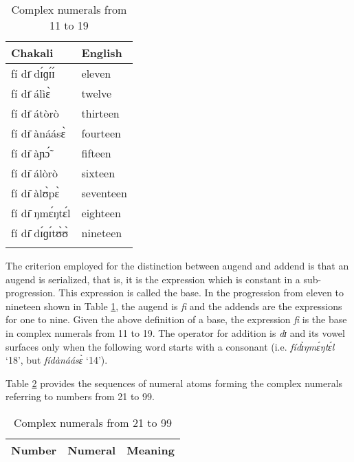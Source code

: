 \begin{exe}
\begin{exe}
\begin{exe}
{\begin{exe}
\begin{exe}
\begin{exe}
\begin{exe}
\begin{exe}
\begin{exe}
\begin{exe}
\begin{xlist}
\begin{exe}
\begin{exe}
\begin{exe}
  \begin{table}[!h]
  \caption{Complex numerals from 11 to 19  \label{tab:numral11-19}}
   \centering

  \begin{tabular}{ll}
\lsptoprule
 Chakali & English   \\ \midrule
 fí dɪ̄ dɪ́ɡɪ́ɪ́ & eleven  \\
 fí dɪ̄ álìɛ̀ & twelve  \\
  fí dɪ̄ átòrò &  thirteen \\
fí dɪ̄ ànáásɛ̀ &  fourteen \\
 fí dɪ̄ àɲɔ̃́ &  fifteen \\
 fí dɪ̄ álòrò  & sixteen  \\
fí dɪ̄ àlʊ̀pɛ̀ &  seventeen \\
  fí dɪ̄ ŋmɛ́ŋtɛ́l  &  eighteen \\
  fí dɪ̄ dɪ́ɡɪ́tʊ̀ʊ̀ &  nineteen \\

\lspbottomrule
\end{tabular}
\end{table}

The criterion employed for  the distinction between augend and addend is that an
augend is serialized, that is, it is the expression which is constant in a
sub-progression. This expression is called the base. In the progression from 
eleven to nineteen shown  in  Table  \ref{tab:numral11-19},  the augend is {\it 
fi} and the addends are the expressions for one to nine. Given the
above definition of a base,  the expression 
{\it fi} is  the base in complex
numerals  from 11 to 19. The operator for
addition is {\it dɪ} and its vowel surfaces only when the
 following word starts with a consonant (i.e. {\it fídɪ̀ŋmɛ́ŋtɛ́l} `18', but
{\it 
fídànáásɛ̀} `14').




Table \ref{tab:numeral21-99} provides the sequences of  numeral atoms
forming the complex numerals referring to  numbers from 21 to 
99. 



  \begin{table}[!h]
  \caption{Complex numerals from 21 to 99  \label{tab:numeral21-99}}
  \centering

  \begin{tabular}{lll}
\lsptoprule 
Number  & Numeral & Meaning  \\ \midrule
    

\end{tabular}
\end{table}
\end{exe}
\end{exe}
\end{exe}
\end{xlist}
\end{exe}
\end{exe}
\end{exe}
\end{exe}
\end{exe}
\end{exe}
\end{exe}}
\end{exe}
\end{exe}
\end{exe}
